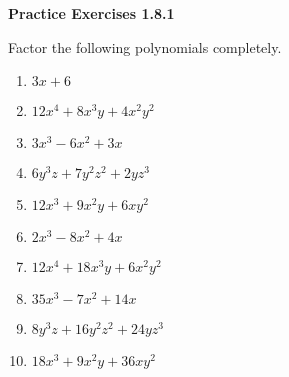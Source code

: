 \vspace{1ex}
\noindent\textbf{Practice Exercises 1.8.1}

\vspace{0.75ex}

Factor the following polynomials completely. 
\begin{multicols}{2}
\begin{enumerate}
\item $3x + 6$
\item $12x^{4} + 8x^{3}y + 4x^{2}y^{2}$
\item $3x^{3} - 6x^{2} + 3x$
\item $6y^{3}z + 7y^{2}z^{2} + 2yz^{3}$
\item $12x^{3} + 9x^{2}y + 6xy^{2}$
\item $2x^{3} - 8x^{2} + 4x$
\item $12x^{4} + 18x^{3}y + 6x^{2}y^{2}$
\item $35x^{3} - 7x^{2} + 14x$
\item $8y^{3}z + 16y^{2}z^{2} + 24yz^{3}$
\item $18x^{3} + 9x^{2}y + 36xy^{2}$
\end{enumerate}
\end{multicols} 